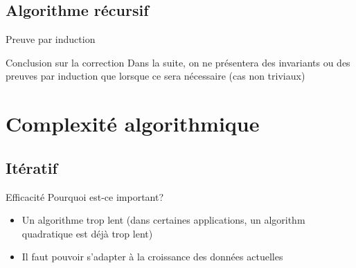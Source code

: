 


\subsection{Algorithme récursif}

\begin{frame}{Preuve par induction}

\end{frame}

\begin{frame}{Conclusion sur la correction}
Dans la suite, on ne présentera des invariants ou des preuves par induction que lorsque ce sera nécessaire (cas non triviaux)
\end{frame}

\section{Complexité algorithmique}

\subsection{Itératif}

\begin{frame}{Efficacité}
Pourquoi est-ce important?
\begin{itemize}
\item Un algorithme trop lent (dans certaines applications, un algorithm quadratique est déjà trop lent)
\item Il faut pouvoir s'adapter à la croissance des données actuelles
\end{itemize}

\end{frame}




